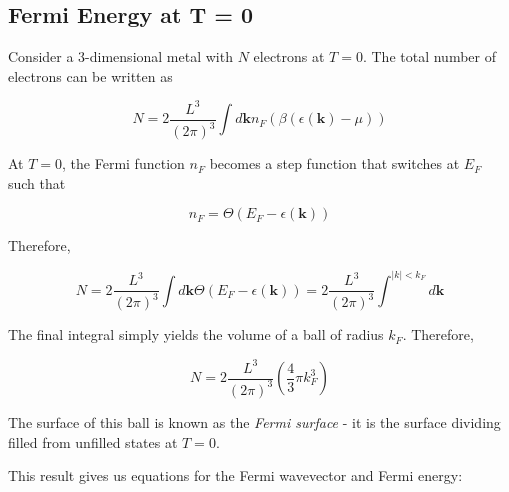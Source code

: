 \documentclass[10pt]{article}
\begin{document}
\subsection{Fermi Energy at T = 0}
Consider a 3-dimensional metal with $N$ electrons at $T = 0$. The total number of electrons can be written as

$$
N = 2 \frac{L^{3}}{(2\pi)^{3}}\int d\textbf{k} n_{F}(\beta(\epsilon(\textbf{k}) - \mu))
$$

At $T = 0$, the Fermi function $n_{F}$ becomes a step function that switches at $E_{F}$ such that

$$n_{F} = \Theta(E_{F} - \epsilon(\textbf{k}))$$

Therefore,

$$
N = 2 \frac{L^{3}}{(2\pi)^{3}}\int d\textbf{k} \Theta(E_{F} - \epsilon(\textbf{k})) = 2 \frac{L^{3}}{(2\pi)^{3}} \int^{|k|<k_{F}}d\textbf{k}
$$

The final integral simply yields the volume of a ball of radius $k_{F}$. Therefore,

$$N = 2 \frac{L^{3}}{(2\pi)^{3}} \left (\frac{4}{3}\pi k_{F}^3\right )$$

The surface of this ball is known as the \emph{Fermi surface} - it is the surface dividing filled from unfilled states at $T = 0$.

This result gives us equations for the Fermi wavevector and Fermi energy:
$$$$
\end{document}
